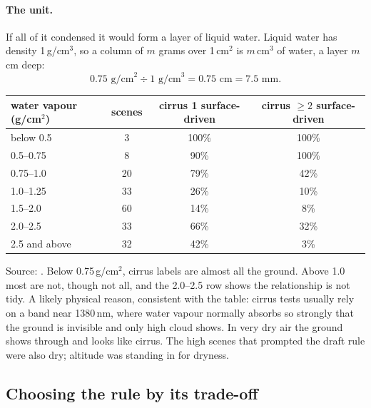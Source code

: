 \paragraph{The unit.} If all of it condensed it would form a layer of liquid water. Liquid water has density 1\,g/cm$^3$, so a column of $m$ grams
over 1\,cm$^2$ is $m$\,cm$^3$ of water, a layer $m$\,cm deep:
\[
  0.75 \text{ g/cm}^2 \div 1 \text{ g/cm}^3 = 0.75 \text{ cm} = 7.5 \text{ mm}.
\]
\begin{center}
\begin{tabular}{lccc}
\toprule
water vapour (g/cm$^2$) & scenes & cirrus 1 surface-driven & cirrus $\ge 2$ surface-driven\\
\midrule
below 0.5 & 3 & 100\% & 100\%\\
0.5--0.75 & 8 & 90\% & 100\%\\
0.75--1.0 & 20 & 79\% & 42\%\\
1.0--1.25 & 33 & 26\% & 10\%\\
1.5--2.0 & 60 & 14\% & 8\%\\
2.0--2.5 & 33 & 66\% & 32\%\\
2.5 and above & 32 & 42\% & 3\%\\
\bottomrule
\end{tabular}
\end{center}
Source: \tbrk{}. Below 0.75\,g/cm$^2$, cirrus labels are almost all the ground. Above 1.0
most are not, though not all, and the 2.0--2.5 row shows the relationship is not tidy. A likely physical reason, consistent with the table: cirrus
tests usually rely on a band near 1380\,nm, where water vapour normally absorbs so strongly that the ground is invisible and only high cloud
shows. In very dry air the ground shows through and looks like cirrus. The high scenes that prompted the draft rule were also dry; altitude was
standing in for dryness.


\subsection{Choosing the rule by its trade-off}

